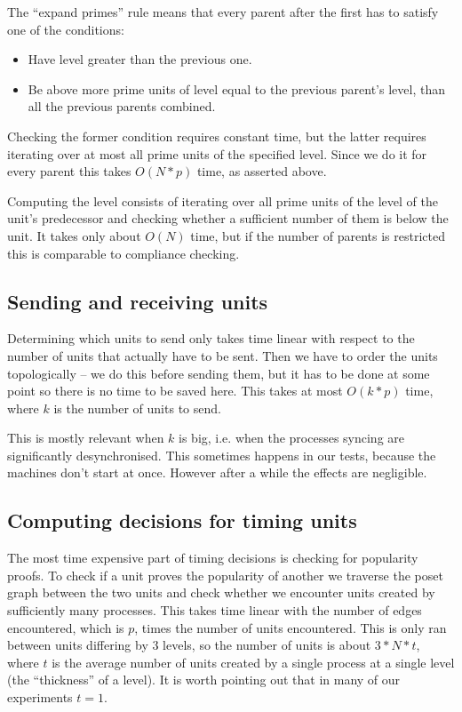 \documentclass[a4paper,10pt]{article}
\begin{document}
			The ``expand primes'' rule means that every parent after the first has to satisfy one of the conditions:
			\begin{itemize}
				\item Have level greater than the previous one.
				\item Be above more prime units of level equal to the previous parent's level, than all the previous parents combined.
			\end{itemize}
			Checking the former condition requires constant time, but the latter requires iterating over at most all prime units of the specified level.
			Since we do it for every parent this takes $O(N*p)$ time, as asserted above.

			Computing the level consists of iterating over all prime units of the level of the unit's predecessor and checking whether a sufficient number of them is below the unit.
			It takes only about $O(N)$ time, but if the number of parents is restricted this is comparable to compliance checking.
		\subsection{Sending and receiving units}
		 Determining which units to send only takes time linear with respect to the number of units that actually have to be sent.
			Then we have to order the units topologically -- we do this before sending them, but it has to be done at some point so there is no time to be saved here.
			This takes at most $O(k*p)$ time, where $k$ is the number of units to send.

			This is mostly relevant when $k$ is big, i.e. when the processes syncing are significantly desynchronised.
			This sometimes happens in our tests, because the machines don't start at once.
			However after a while the effects are negligible.
		\subsection{Computing decisions for timing units}
		 The most time expensive part of timing decisions is checking for popularity proofs.
			To check if a unit proves the popularity of another we traverse the poset graph between the two units and check whether
			we encounter units created by sufficiently many processes. This takes time linear with the number of edges encountered,
			which is $p$, times the number of units encountered. This is only ran between units differing by $3$ levels, so the number of units
			is about $3*N*t$, where $t$ is the average number of units created by a single process at a single level (the ``thickness'' of a level).
			It is worth pointing out that in many of our experiments	$t = 1$.
\end{document}

